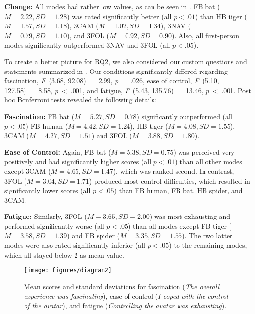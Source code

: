 \textbf{Change:} All modes had rather low values, as can be seen in . FB bat ($M = 2.22, SD = 1.28$) was rated significantly better (all $p < .01$) than HB tiger ($M = 1.57, SD = 1.18$), 3CAM ($M = 1.02, SD = 1.34$), 3NAV ($M = 0.79, SD = 1.10$), and 3FOL ($M = 0.92, SD = 0.90$). Also, all first-person modes significantly outperformed 3NAV and 3FOL (all $p < .05$).

To create a better picture for RQ2, we also considered our custom questions and statements summarized in . Our conditions significantly differed regarding fascination, \textit{F}~(3.68, 92.08)~=~2.99, \textit{p}~=~.026, ease of control, \textit{F}~(5.10, 127.58)~=~8.58, \textit{p}~<~.001, and fatigue, \textit{F}~(5.43, 135.76)~=~13.46, \textit{p}~<~.001.  Post hoc Bonferroni tests revealed the following details:


\textbf{Fascination:} FB bat ($M = 5.27, SD = 0.78$) significantly outperformed (all $p < .05$) FB human ($M = 4.42, SD = 1.24$), HB tiger ($M = 4.08, SD = 1.55$), 3CAM ($M = 4.27, SD = 1.51$) and 3FOL ($M = 3.88, SD = 1.80$). 

\textbf{Ease of Control:} Again, FB bat ($M = 5.38, SD = 0.75$) was perceived very positively and had significantly higher scores (all $p < .01$) than all other modes except 3CAM ($M = 4.65, SD = 1.47$), which was ranked second. In contrast, 3FOL ($M = 3.04, SD = 1.71$) produced most control difficulties, which resulted in significantly lower scores (all $p < .05$) than FB human, FB bat, HB spider, and 3CAM. 

\textbf{Fatigue:} Similarly, 3FOL ($M = 3.65, SD = 2.00$) was most exhausting and performed significantly worse (all $p < .05$) than all modes except FB tiger ($M = 3.58, SD = 1.39$) and FB spider ($M = 3.35, SD = 1.55$). The two latter modes were also rated significantly inferior (all $p < .05$) to the remaining modes, which all stayed below 2 as mean value.



\begin{figure*}[t!]
\centering
\texttt{[image: figures/diagram2]}
\caption{Mean scores and standard deviations for fascination (\textit{The overall experience was fascinating}), ease of control (\textit{I coped with the control of the avatar}), and fatigue (\textit{Controlling the avatar was exhausting}).}
\label{fig:diagram2}
\end{figure*}




